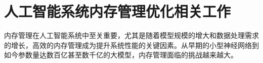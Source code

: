 

\section{人工智能系统内存管理优化相关工作}

内存管理在人工智能系统中至关重要，尤其是随着模型规模的增大和数据处理需求的增长，高效的内存管理成为提升系统性能的关键因素。从早期的小型神经网络到如今参数量达数百亿甚至数千亿的大模型，内存管理面临的挑战越来越大。

